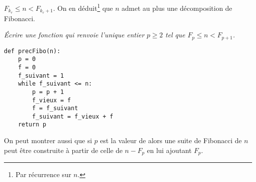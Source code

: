 $F_{k_r} \le n < F_{k_r+1}$. On en déduit\footnote{Par récurrence sur $n$.} que $n$ admet au plus une décomposition de Fibonacci.
\begin{Exercise}[title = {Nombre de Fibonacci précédent}]\it 
Écrire une fonction  qui renvoie l'unique entier $p\ge 2$ tel que $F_p \le n < F_{p+1}$.
\end{Exercise}
\begin{Answer}
\begin{lstlisting}
def precFibo(n):
    p = 0
    f = 0
    f_suivant = 1
    while f_suivant <= n:
        p = p + 1
        f_vieux = f
        f = f_suivant
        f_suivant = f_vieux + f
    return p
\end{lstlisting}
\newpage
\end{Answer}

\medskip

On peut montrer aussi que si $p$ est la valeur de  alors une suite de Fibonacci de $n$ peut être construite à partir de celle de $n-F_p$ en lui ajoutant $F_p$. 

